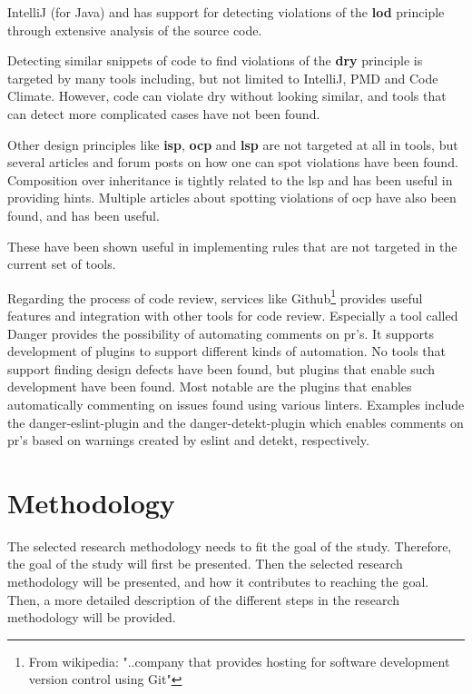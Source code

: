 \documentclass{report}
\begin{document}
IntelliJ \cite{IntelliJ} (for Java) and \cite{pmd} has support for detecting violations of the \textbf{\gls{lod}} principle through extensive analysis of the source code.

Detecting similar snippets of code to find violations of the \textbf{\gls{dry}} principle is targeted by many tools including, but not limited to IntelliJ\cite{IntelliJ}, PMD\cite{pmd} and Code Climate\cite{codeclimate}. However, code can violate \gls{dry} without looking similar, and tools that can detect more complicated cases have not been found.  

Other design principles like \textbf{\gls{isp}}, \textbf{\gls{ocp}} and \textbf{\gls{lsp}} are not targeted at all in tools, but several articles and forum posts on how one can spot violations have been found. Composition over inheritance is tightly related to the \gls{lsp} and \cite{composition-over-inheritance-stackoverflow} has been useful in providing hints. Multiple articles about spotting violations of \gls{ocp} have also been found, and has been useful.

 These have been shown useful in implementing rules that are not targeted in the current set of tools.

Regarding the process of code review, services like Github\cite{github}\footnote{From wikipedia: "..company that provides hosting for software development version control using Git"\cite{github-wiki}} provides useful features and integration with other tools for code review. Especially a tool called Danger\cite{danger} provides the possibility of automating comments on \gls{pr}'s. It supports development of plugins to support different kinds of automation. No tools that support finding design defects have been found, but plugins that enable such development have been found. Most notable are the plugins that enables automatically commenting on issues found using various linters. Examples include the danger-eslint-plugin\cite{danger-eslint-plugin} and the danger-detekt-plugin\cite{danger-detekt-plugin} which enables comments on \gls{pr}'s based on warnings created by eslint\cite{eslint} and detekt\cite{detekt}, respectively. 

\chapter{Methodology}
\label{methodology}
The selected research methodology needs to fit the goal of the study. Therefore, the goal of the study will first be presented. Then the selected research methodology will be presented, and how it contributes to reaching the goal. Then, a more detailed description of the different steps in the research methodology will be provided. 
\end{document}
